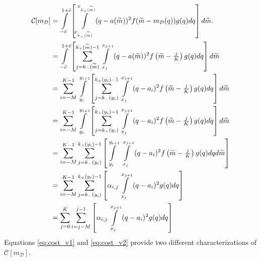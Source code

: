 \documentclass[12pt]{article}
\begin{document}
\begin{align}
	\mathcal{C}[m_{\mathcal{D}}]&=\int\displaylimits_{-\bar{e}}^{1+\bar{e}}{\left[\int\displaylimits_{x_{k_{-}(\widetilde{m})}}^{x_{k_{+}(\widetilde{m})}}{(q-a(\widetilde{m}))^{2}f(\widetilde{m}-m_{\mathcal{D}}(q))g(q)dq}\right]d\widetilde{m}}.\\
	&=\int\displaylimits_{-\bar{e}}^{1+\bar{e}}{\left[\sum_{j=k_{-}(\widetilde{m})}^{k_{+}(\widetilde{m})-1}{\int\displaylimits_{x_{j}}^{x_{j+1}}{(q-a(\widetilde{m}))^{2}f\left(\widetilde{m}-\tfrac{j}{K}\right)g(q)dq}}\right]d\widetilde{m}}\\
	&=\sum_{i=-M}^{K-1}{\int\displaylimits_{y_{i}}^{y_{i+1}}{\left[\sum_{j=k_{-}(y_{i})}^{k_{+}(y_{i})-1}{\int\displaylimits_{x_{j}}^{x_{j+1}}{(q-a_{i})^{2}f\left(\widetilde{m}-\tfrac{j}{K}\right)g(q)dq}}\right]d\widetilde{m}}}\\
	&=\sum_{i=-M}^{K-1}{\int\displaylimits_{y_{i}}^{y_{i+1}}{\left[\sum_{j=k_{-}(y_{i})}^{k_{+}(y_{i})-1}{\int\displaylimits_{x_{j}}^{x_{j+1}}{(q-a_{i})^{2}f\left(\widetilde{m}-\tfrac{j}{K}\right)g(q)dq}}\right]d\widetilde{m}}}\\
	&=\sum_{i=-M}^{K-1}{\sum_{j=k_{-}(y_{i})}^{k_{+}(y_{i})-1}{\left[\int\displaylimits_{y_{i}}^{y_{i+1}}{\:\int\displaylimits_{x_{j}}^{x_{j+1}}{(q-a_{i})^{2}f\left(\widetilde{m}-\tfrac{j}{K}\right)g(q)dq}}d\widetilde{m}\right]}}\\
	&=\sum_{i=-M}^{K-1}{\sum_{j=k_{-}(y_{i})}^{k_{+}(y_{i})-1}{\left[\alpha_{i,j}\int\displaylimits_{x_{j}}^{x_{j+1}}{(q-a_{i})^{2}g(q)dq}\right]}}\label{eq:cost_v1}\\
	&=\sum_{j=0}^{K}{\sum_{i=j-M}^{j-1}{\left[\alpha_{i,j}\int\displaylimits_{x_{j}}^{x_{j+1}}{(q-a_{i})^{2}g(q)dq}\right]}}\label{eq:cost_v2}
\end{align}
Equations \ref{eq:cost_v1} and \ref{eq:cost_v2} provide two different characterizations of $\mathcal{C}[m_{\mathcal{D}}]$.

\end{document}
